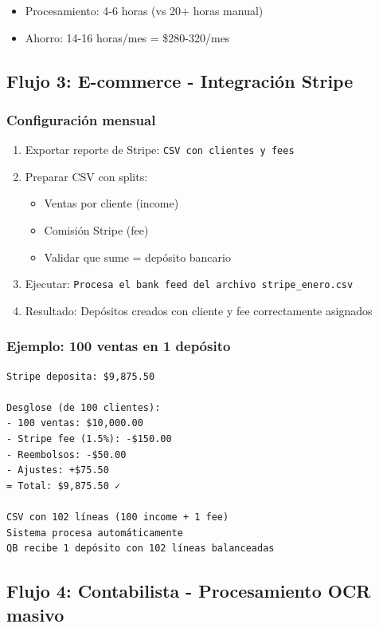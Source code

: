 \documentclass[12pt,oneside]{article}
\begin{document}
\begin{itemize}
    \item Procesamiento: 4-6 horas (vs 20+ horas manual)
    \item Ahorro: 14-16 horas/mes = \$280-320/mes
\end{itemize}

\subsection{Flujo 3: E-commerce - Integración Stripe}

\subsubsection{Configuración mensual}

\begin{enumerate}
    \item Exportar reporte de Stripe: \texttt{CSV con clientes y fees}
    \item Preparar CSV con splits:
    \begin{itemize}
        \item Ventas por cliente (income)
        \item Comisión Stripe (fee)
        \item Validar que sume = depósito bancario
    \end{itemize}
    \item Ejecutar: \texttt{Procesa el bank feed del archivo stripe\_enero.csv}
    \item Resultado: Depósitos creados con cliente y fee correctamente asignados
\end{enumerate}

\subsubsection{Ejemplo: 100 ventas en 1 depósito}

\begin{verbatim}
Stripe deposita: $9,875.50

Desglose (de 100 clientes):
- 100 ventas: $10,000.00
- Stripe fee (1.5%): -$150.00
- Reembolsos: -$50.00
- Ajustes: +$75.50
= Total: $9,875.50 ✓

CSV con 102 líneas (100 income + 1 fee)
Sistema procesa automáticamente
QB recibe 1 depósito con 102 líneas balanceadas
\end{verbatim}

\subsection{Flujo 4: Contabilista - Procesamiento OCR masivo}
\end{document}
